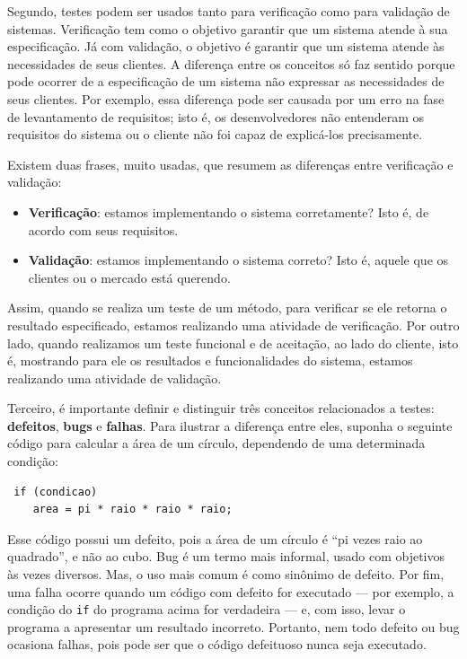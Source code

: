 \documentclass[
  11pt,
  twoside]{book}
\newcommand{\passthrough}[1]{#1}
\begin{document}
Segundo, testes podem ser usados tanto para verificação como para
validação de sistemas. Verificação tem como o objetivo garantir que um
sistema atende à sua especificação. Já com validação, o objetivo é
garantir que um sistema atende às necessidades de seus clientes. A
diferença entre os conceitos só faz sentido porque pode ocorrer de a
especificação de um sistema não expressar as necessidades de seus
clientes. Por exemplo, essa diferença pode ser causada por um erro na
fase de levantamento de requisitos; isto é, os desenvolvedores não
entenderam os requisitos do sistema ou o cliente não foi capaz de
explicá-los precisamente.

Existem duas frases, muito usadas, que resumem as diferenças entre
verificação e validação:

\begin{itemize}
\item
  \textbf{Verificação}: estamos implementando o sistema corretamente?
  Isto é, de acordo com seus requisitos.
\item
  \textbf{Validação}: estamos implementando o sistema correto? Isto é,
  aquele que os clientes ou o mercado está querendo.
\end{itemize}

Assim, quando se realiza um teste de um método, para verificar se ele
retorna o resultado especificado, estamos realizando uma atividade de
verificação. Por outro lado, quando realizamos um teste funcional e de
aceitação, ao lado do cliente, isto é, mostrando para ele os resultados
e funcionalidades do sistema, estamos realizando uma atividade de
validação.

   Terceiro, é importante
definir e distinguir três conceitos relacionados a testes:
\textbf{defeitos}, \textbf{bugs} e \textbf{falhas}. Para ilustrar a
diferença entre eles, suponha o seguinte código para calcular a área de
um círculo, dependendo de uma determinada condição:

\begin{lstlisting}
 if (condicao)
    area = pi * raio * raio * raio; 
\end{lstlisting}

Esse código possui um defeito, pois a área de um círculo é ``pi vezes
raio ao quadrado'', e não ao cubo. Bug é um termo mais informal, usado
com objetivos às vezes diversos. Mas, o uso mais comum é como sinônimo
de defeito. Por fim, uma falha ocorre quando um código com defeito for
executado --- por exemplo, a condição do \passthrough{\lstinline!if!} do
programa acima for verdadeira --- e, com isso, levar o programa a
apresentar um resultado incorreto. Portanto, nem todo defeito ou bug
ocasiona falhas, pois pode ser que o código defeituoso nunca seja
executado.
\end{document}
